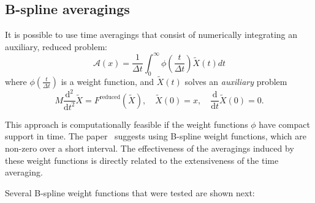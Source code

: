 \documentclass[11pt]{article}
\begin{document}
\subsection{B-spline averagings\label{se:b-spline}}

It is possible to use time averagings that consist of numerically integrating
an auxiliary, reduced problem:
\begin{equation}
\mathcal{A}(x)=\frac{1}{\Delta t}\int_{0}^{\infty}\phi\left(  \frac{t}{\Delta
t}\right)  \tilde{X}(t)dt \label{eq:weightave}
\end{equation}
where $\phi\left(  \frac{t}{\Delta t}\right)  $
 is a weight function, and $\tilde{X}(t)$
 solves an \emph{auxiliary} problem
	\begin{equation}
M\frac{\mathrm{d}^{2}}{\mathrm{d}t^{2}}\tilde{X}=F^{\mathrm{reduced}}
(\tilde{X}),\quad\tilde{X}(0)=x,\quad\frac{\mathrm{d}}{\mathrm{d}t}\tilde
{X}(0)=0. \label{eq:reducedflow}
\end{equation}

This approach is computationally feasible if the weight functions $\phi$ have
compact support in time. The paper~\cite{GaSS98b} suggests using
B-spline weight 
functions, which are non-zero over a short interval. The effectiveness of the
averagings induced by these weight functions is directly related to the
extensiveness of the time averaging.

Several B-spline weight functions that were tested are shown next:
\end{document}
